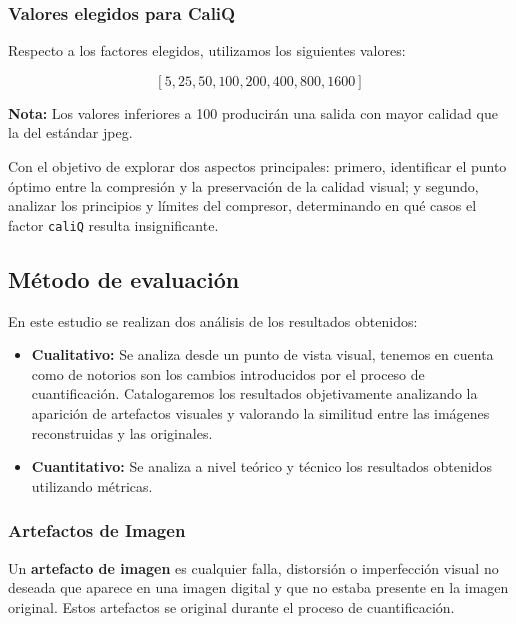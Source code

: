 \documentclass[a4paper, 12pt]{article}
\begin{document}
\subsubsection{Valores elegidos para CaliQ}
Respecto a los factores elegidos, utilizamos los siguientes valores:

\[
[5, 25, 50, 100, 200, 400, 800, 1600]
\]
 
\textbf{Nota:} Los valores inferiores a 100 producirán una salida con mayor calidad que la del estándar jpeg.

Con el objetivo de explorar dos aspectos principales: primero, identificar el punto óptimo entre la compresión y la preservación de la calidad visual; y segundo, analizar los principios y límites del compresor, determinando en qué casos el factor \texttt{caliQ} resulta insignificante.


\subsection{Método de evaluación}
En este estudio se realizan dos análisis de los resultados obtenidos:
\begin{itemize}
    \item  \textbf{Cualitativo:} Se analiza desde un punto de vista visual, tenemos en cuenta como de notorios son los cambios introducidos por el proceso de cuantificación. Catalogaremos los resultados objetivamente analizando la aparición de artefactos visuales y valorando la similitud entre las imágenes reconstruidas y las originales.
    \item   \textbf{Cuantitativo:} Se analiza a nivel teórico y técnico los resultados obtenidos utilizando métricas. 
\end{itemize}

\subsubsection{Artefactos de Imagen}

Un \textbf{artefacto de imagen} es cualquier falla, distorsión o imperfección visual no deseada que aparece en una imagen digital y que no estaba presente en la imagen original. Estos artefactos se original durante el proceso de cuantificación.
\end{document}
